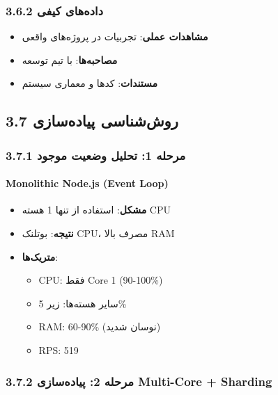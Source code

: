 \documentclass[
]{article}
\providecommand{\tightlist}{%
  \setlength{\itemsep}{0pt}\setlength{\parskip}{0pt}}
\begin{document}
\subsubsection{3.6.2 داده‌های
کیفی}\label{ux62fux627ux62fux647ux647ux627ux6cc-ux6a9ux6ccux641ux6cc}

\begin{itemize}
\tightlist
\item
  \textbf{مشاهدات عملی}: تجربیات در پروژه‌های واقعی
\item
  \textbf{مصاحبه‌ها}: با تیم توسعه
\item
  \textbf{مستندات}: کدها و معماری سیستم
\end{itemize}

\subsection{3.7 روش‌شناسی
پیاده‌سازی}\label{ux631ux648ux634ux634ux646ux627ux633ux6cc-ux67eux6ccux627ux62fux647ux633ux627ux632ux6cc}

\subsubsection{3.7.1 مرحله 1: تحلیل وضعیت
موجود}\label{ux645ux631ux62dux644ux647-1-ux62aux62dux644ux6ccux644-ux648ux636ux639ux6ccux62a-ux645ux648ux62cux648ux62f}

\paragraph{Monolithic Node.js (Event
Loop)}\label{monolithic-node.js-event-loop}

\begin{itemize}
\tightlist
\item
  \textbf{مشکل}: استفاده از تنها 1 هسته CPU
\item
  \textbf{نتیجه}: بوتلنک CPU، مصرف بالا RAM
\item
  \textbf{متریک‌ها}:

  \begin{itemize}
  \tightlist
  \item
    CPU: فقط Core 1 (90-100\%)
  \item
    سایر هسته‌ها: زیر 5\%
  \item
    RAM: 60-90\% (نوسان شدید)
  \item
    RPS: 519
  \end{itemize}
\end{itemize}

\subsubsection{3.7.2 مرحله 2: پیاده‌سازی Multi-Core +
Sharding}\label{ux645ux631ux62dux644ux647-2-ux67eux6ccux627ux62fux647ux633ux627ux632ux6cc-multi-core-sharding}
\end{document}
